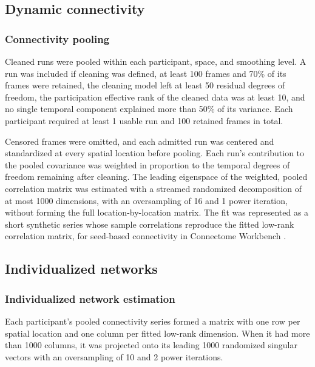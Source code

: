 \subsection*{Dynamic connectivity}

\subsubsection*{Connectivity pooling}

Cleaned runs were pooled within each participant, space, and smoothing level. A run was included if cleaning was defined, at least 100 frames and 70\% of its frames were retained, the cleaning model left at least 50 residual degrees of freedom, the participation effective rank of the cleaned data was at least 10, and no single temporal component explained more than 50\% of its variance. Each participant required at least 1 usable run and 100 retained frames in total.

Censored frames were omitted, and each admitted run was centered and standardized at every spatial location before pooling. Each run's contribution to the pooled covariance was weighted in proportion to the temporal degrees of freedom remaining after cleaning. The leading eigenspace of the weighted, pooled correlation matrix was estimated with a streamed randomized decomposition \citep{halko2011randomized} of at most 1000 dimensions, with an oversampling of 16 and 1 power iteration, without forming the full location-by-location matrix. The fit was represented as a short synthetic series whose sample correlations reproduce the fitted low-rank correlation matrix, for seed-based connectivity in Connectome Workbench \citep{marcus2011workbench}.

\subsection*{Individualized networks}

\subsubsection*{Individualized network estimation}

Each participant's pooled connectivity series formed a matrix with one row per spatial location and one column per fitted low-rank dimension. When it had more than 1000 columns, it was projected onto its leading 1000 randomized singular vectors \citep{halko2011randomized} with an oversampling of 10 and 2 power iterations.

